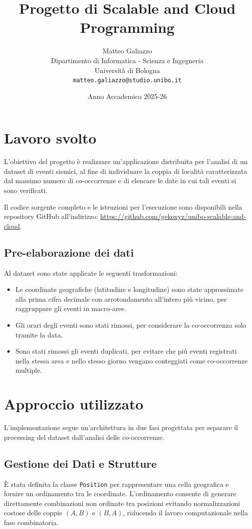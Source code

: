 \documentclass{article}
\title{Progetto di Scalable and Cloud Programming}
\author{
  Matteo Galiazzo\\
  Dipartimento di Informatica - Scienza e Ingegneria\\
  Università di Bologna\\
  \texttt{matteo.galiazzo@studio.unibo.it}\\
}
\date{Anno Accademico 2025-26}
\begin{document}
\maketitle

\tableofcontents

\section{Lavoro svolto}
L'obiettivo del progetto è realizzare un'applicazione distribuita per l'analisi di un dataset di eventi sismici, al fine di individuare la coppia di località caratterizzata dal massimo numero di co-occorrenze e di elencare le date in cui tali eventi si sono verificati.

Il codice sorgente completo e le istruzioni per l'esecuzione sono disponibili nella repository GitHub all'indirizzo:
\newline
\url{https://github.com/gekoxyz/unibo-scalable-and-cloud}.

\subsection{Pre-elaborazione dei dati}
Al dataset sono state applicate le seguenti trasformazioni:
\begin{itemize}
  \item Le coordinate geografiche (latitudine e longitudine) sono state approssimate alla prima cifra decimale con arrotondamento all'intero più vicino, per raggruppare gli eventi in macro-aree.
  \item Gli orari degli eventi sono stati rimossi, per considerare la co-occorrenza solo tramite la data.
  \item Sono stati rimossi gli eventi duplicati, per evitare che più eventi registrati nella stessa area e nello stesso giorno vengano conteggiati come co-occorrenze multiple.
\end{itemize}

\section{Approccio utilizzato}
L'implementazione segue un'architettura in due fasi progettata per separare il processing del dataset dall'analisi delle co-occorrenze.

\subsection{Gestione dei Dati e Strutture}
È stata definita la classe \texttt{Position} per rappresentare una cella geografica e fornire un ordinamento tra le coordinate.
L'ordinamento consente di generare direttamente combinazioni non ordinate tra posizioni evitando normalizzazioni costose delle coppie \((A,B)\) e \((B,A)\), riducendo il lavoro computazionale nella fase combinatoria.
\end{document}
